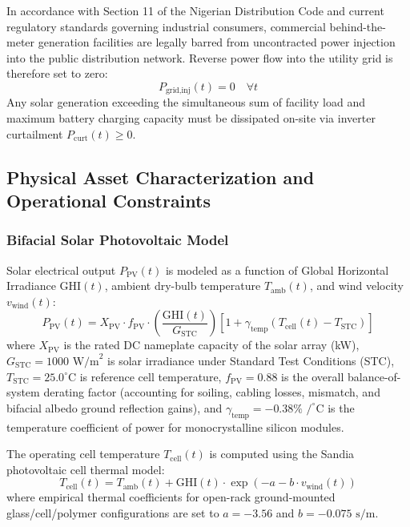 \documentclass[11pt,a4paper]{article}
\begin{document}
In accordance with Section 11 of the Nigerian Distribution Code and current regulatory standards governing industrial consumers, commercial behind-the-meter generation facilities are legally barred from uncontracted power injection into the public distribution network. Reverse power flow into the utility grid is therefore set to zero:
\begin{equation}
    P_{\text{grid,inj}}(t) = 0 \quad \forall t
    \label{eq:no_export}
\end{equation}
Any solar generation exceeding the simultaneous sum of facility load and maximum battery charging capacity must be dissipated on-site via inverter curtailment $P_{\text{curt}}(t) \ge 0$.

\subsection{Physical Asset Characterization and Operational Constraints}
\label{sec:asset_constraints}

\subsubsection{Bifacial Solar Photovoltaic Model}
Solar electrical output $P_{\text{PV}}(t)$ is modeled as a function of Global Horizontal Irradiance $\text{GHI}(t)$, ambient dry-bulb temperature $T_{\text{amb}}(t)$, and wind velocity $v_{\text{wind}}(t)$:
\begin{equation}
    P_{\text{PV}}(t) = X_{\text{PV}} \cdot f_{\text{PV}} \cdot \left(\frac{\text{GHI}(t)}{G_{\text{STC}}}\right) \left[ 1 + \gamma_{\text{temp}} \left( T_{\text{cell}}(t) - T_{\text{STC}} \right) \right]
    \label{eq:pv}
\end{equation}
where $X_{\text{PV}}$ is the rated DC nameplate capacity of the solar array (kW), $G_{\text{STC}} = 1000\text{ W/m}^2$ is solar irradiance under Standard Test Conditions (STC), $T_{\text{STC}} = 25.0^\circ\text{C}$ is reference cell temperature, $f_{\text{PV}} = 0.88$ is the overall balance-of-system derating factor (accounting for soiling, cabling losses, mismatch, and bifacial albedo ground reflection gains), and $\gamma_{\text{temp}} = -0.38\%\text{ /}^\circ\text{C}$ is the temperature coefficient of power for monocrystalline silicon modules.

The operating cell temperature $T_{\text{cell}}(t)$ is computed using the Sandia photovoltaic cell thermal model:
\begin{equation}
    T_{\text{cell}}(t) = T_{\text{amb}}(t) + \text{GHI}(t) \cdot \exp\left( -a - b \cdot v_{\text{wind}}(t) \right)
    \label{eq:tcell}
\end{equation}
where empirical thermal coefficients for open-rack ground-mounted glass/cell/polymer configurations are set to $a = -3.56$ and $b = -0.075\text{ s/m}$.
\end{document}
